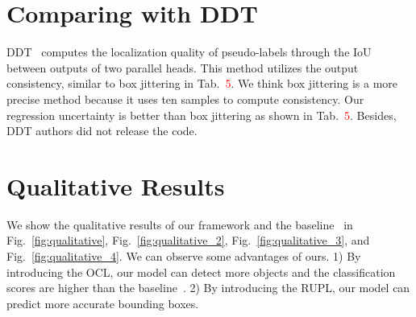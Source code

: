 \documentclass{bmvc2k}
\begin{document}
\section{Comparing with DDT}
DDT~\cite{zheng2022dual} computes the localization quality of pseudo-labels through the IoU between outputs of two parallel heads. This method utilizes the output consistency, similar to box jittering in Tab.~\textcolor{red}{5}. We think box jittering is a more precise method because it uses ten samples to compute consistency. Our regression uncertainty is better than box jittering as shown in Tab.~\textcolor{red}{5}. Besides, DDT authors did not release the code.
\section{Qualitative Results}
We show the qualitative results of our framework and the baseline~\cite{liu2021unbiased} in Fig.~\ref{fig:qualitative}, Fig.~\ref{fig:qualitative_2}, Fig.~\ref{fig:qualitative_3}, and Fig.~\ref{fig:qualitative_4}. We can observe some advantages of ours. 1) By introducing the OCL, our model can detect more objects and the classification scores are higher than the baseline~\cite{liu2021unbiased}. 2) By introducing the RUPL, our model can predict more accurate bounding boxes.
\end{document}
